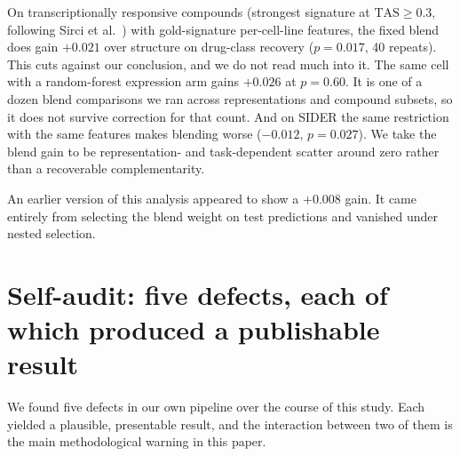 \documentclass[conference]{IEEEtran}
\begin{document}
On transcriptionally responsive compounds (strongest signature at
$\mathrm{TAS} \ge 0.3$, following Sirci et al.~\cite{sirci2017}) with
gold-signature per-cell-line features, the fixed blend does gain $+0.021$ over structure on drug-class recovery
($p = 0.017$, 40 repeats). This cuts against our conclusion, and we do not
read much into it. The same cell with a random-forest expression
arm gains $+0.026$ at $p = 0.60$. It is one of a dozen blend comparisons we ran
across representations and compound subsets, so it does not survive correction
for that count. And on SIDER the same restriction with the same features makes
blending worse ($-0.012$, $p = 0.027$). We take the blend gain to be
representation- and task-dependent scatter around zero rather than a recoverable
complementarity.

An earlier version of this analysis appeared to show a $+0.008$ gain. It came
entirely from selecting the blend weight on test predictions and vanished under
nested selection.

\section{Self-audit: five defects, each of which produced a publishable result}
\label{sec:audit}

We found five defects in our own pipeline over the course of this study. Each
yielded a plausible, presentable result, and the interaction between two of them
is the main methodological warning in this paper.
\end{document}
